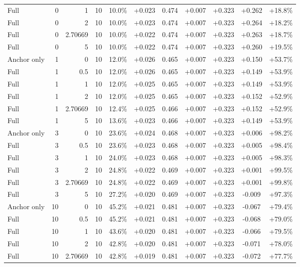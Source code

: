 \begin{table}[htbp]
\begin{tabular}{lrrrccccccc}
Full & 0 & 1 & 10 & 10.0\% & +0.023 & 0.474 & +0.007 & +0.323 & +0.262 & +18.8\% \\
Full & 0 & 2 & 10 & 10.0\% & +0.023 & 0.474 & +0.007 & +0.323 & +0.264 & +18.2\% \\
Full & 0 & 2.70669 & 10 & 10.0\% & +0.022 & 0.474 & +0.007 & +0.323 & +0.263 & +18.7\% \\
Full & 0 & 5 & 10 & 10.0\% & +0.022 & 0.474 & +0.007 & +0.323 & +0.260 & +19.5\% \\
Anchor only & 1 & 0 & 10 & 12.0\% & +0.026 & 0.465 & +0.007 & +0.323 & +0.150 & +53.7\% \\
Full & 1 & 0.5 & 10 & 12.0\% & +0.026 & 0.465 & +0.007 & +0.323 & +0.149 & +53.9\% \\
Full & 1 & 1 & 10 & 12.0\% & +0.025 & 0.465 & +0.007 & +0.323 & +0.149 & +53.9\% \\
Full & 1 & 2 & 10 & 12.0\% & +0.025 & 0.465 & +0.007 & +0.323 & +0.152 & +52.9\% \\
Full & 1 & 2.70669 & 10 & 12.4\% & +0.025 & 0.466 & +0.007 & +0.323 & +0.152 & +52.9\% \\
Full & 1 & 5 & 10 & 13.6\% & +0.023 & 0.466 & +0.007 & +0.323 & +0.149 & +53.9\% \\
Anchor only & 3 & 0 & 10 & 23.6\% & +0.024 & 0.468 & +0.007 & +0.323 & +0.006 & +98.2\% \\
Full & 3 & 0.5 & 10 & 23.6\% & +0.023 & 0.468 & +0.007 & +0.323 & +0.005 & +98.4\% \\
Full & 3 & 1 & 10 & 24.0\% & +0.023 & 0.468 & +0.007 & +0.323 & +0.005 & +98.3\% \\
Full & 3 & 2 & 10 & 24.8\% & +0.022 & 0.469 & +0.007 & +0.323 & +0.001 & +99.5\% \\
Full & 3 & 2.70669 & 10 & 24.8\% & +0.022 & 0.469 & +0.007 & +0.323 & +0.001 & +99.8\% \\
Full & 3 & 5 & 10 & 27.2\% & +0.020 & 0.469 & +0.007 & +0.323 & -0.009 & +97.3\% \\
Anchor only & 10 & 0 & 10 & 45.2\% & +0.021 & 0.481 & +0.007 & +0.323 & -0.067 & +79.4\% \\
Full & 10 & 0.5 & 10 & 45.2\% & +0.021 & 0.481 & +0.007 & +0.323 & -0.068 & +79.0\% \\
Full & 10 & 1 & 10 & 43.6\% & +0.020 & 0.481 & +0.007 & +0.323 & -0.066 & +79.5\% \\
Full & 10 & 2 & 10 & 42.8\% & +0.020 & 0.481 & +0.007 & +0.323 & -0.071 & +78.0\% \\
Full & 10 & 2.70669 & 10 & 42.8\% & +0.019 & 0.481 & +0.007 & +0.323 & -0.072 & +77.7\% \\

\end{tabular}
\end{table}
